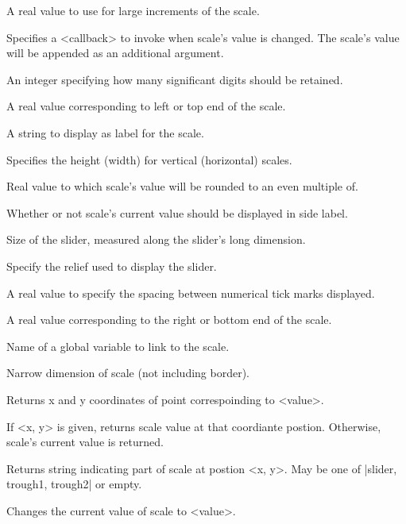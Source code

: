 \vskip5pt
\begin{enum}{1cm}

A real value to use for large increments of the scale.

Specifies a <callback> to invoke when scale's value is changed.
The scale's value will be appended as an additional argument.

An integer specifying how many significant digits should be retained.

A real value corresponding to left or top end of the scale.

A string to display as label for the scale.

Specifies the height (width) for vertical (horizontal) scales.

Real value to which scale's value will be rounded to an even multiple of.

Whether or not scale's current value should be displayed in side label.

Size of the  slider, measured along the slider's long dimension.

Specify the relief used to display the slider.

A real value to specify the spacing between numerical tick marks displayed.

A real value corresponding to  the  right  or bottom end of the scale.

Name of a global variable to link to  the scale.

Narrow dimension of scale (not including border).

\end{enum}
\vskip5pt
\begin{enum}{1cm}

Returns x and y coordinates of point correspoinding to <value>.

If <x, y> is given, returns scale value at that coordiante postion.
Otherwise, scale's current value is returned.

Returns string indicating part of scale at postion <x, y>. May be one
of |slider, trough1, trough2| or empty.

Changes the current value of scale to <value>.

\end{enum}


